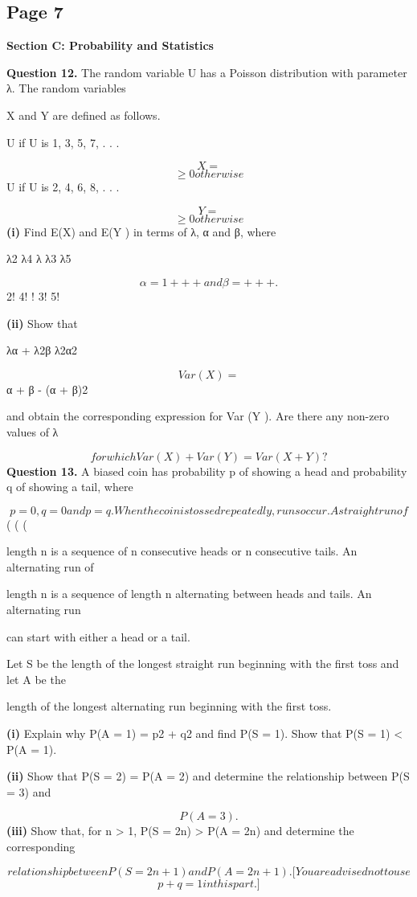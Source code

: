 \documentclass[12pt]{article}
\begin{document}
\subsection*{Page 7}
\begin{flushleft}
\bigskip\textbf{Section C: Probability and Statistics}\par
\bigskip\textbf{Question 12.} The random variable U has a Poisson distribution with parameter λ. The random variables\par
X and Y are defined as follows.\par
U if U is 1, 3, 5, 7, . . .\par
\[X =\]
\[\geq0 otherwise\]
U if U is 2, 4, 6, 8, . . .\par
\[Y =\]
\[\geq0 otherwise\]
\textbf{(i)} Find E(X) and E(Y ) in terms of λ, α and β, where\par
λ2 λ4 λ λ3 λ5\par
\[α = 1 + + + and β = + + + .\]
2! 4! ! 3! 5! \cdots\par
\textbf{(ii)} Show that\par
λα + λ2β λ2α2\par
\[Var (X) =\]
α + β - (α + β)2\par
and obtain the corresponding expression for Var (Y ). Are there any non-zero values of λ\par
\[for which Var (X) + Var (Y ) = Var (X + Y ) ?\]
\bigskip\textbf{Question 13.} A biased coin has probability p of showing a head and probability q of showing a tail, where\par
\[p = 0, q = 0 and p = q. When the coin is tossed repeatedly, runs occur. A straight run of\]
( ( (\par
length n is a sequence of n consecutive heads or n consecutive tails. An alternating run of\par
length n is a sequence of length n alternating between heads and tails. An alternating run\par
can start with either a head or a tail.\par
Let S be the length of the longest straight run beginning with the first toss and let A be the\par
length of the longest alternating run beginning with the first toss.\par
\textbf{(i)} Explain why P(A = 1) = p2 + q2 and find P(S = 1). Show that P(S = 1) < P(A = 1).\par
\textbf{(ii)} Show that P(S = 2) = P(A = 2) and determine the relationship between P(S = 3) and\par
\[P(A = 3).\]
\textbf{(iii)} Show that, for n > 1, P(S = 2n) > P(A = 2n) and determine the corresponding\par
\[relationship between P(S = 2n + 1) and P(A = 2n + 1). [You are advised not to use\]
\[p + q = 1 in this part.]\]
\end{flushleft}
\end{document}
